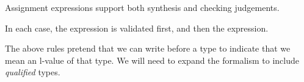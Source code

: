 \begin{Description}
Assignment expressions support both synthesis and checking judgements.

In each case, the  expression is validated first, and then the  expression.
\end{Description}

\begin{Incomplete}
The above rules pretend that we can write  before a type to indicate that we mean an l-value of that type.
We will need to expand the formalism to include \emph{qualified} types.
\end{Incomplete}



\begin{Syntax}
	 \\
         

     \\
        \code{+}  \\
        \SynOr \code{-}  \\
        \SynOr \code{\~}  \\
        \SynOr \code{!}  \\
        \SynOr \code{++}  \\
        \SynOr \code{--}  \\
\end{Syntax}

\begin{Checking}

\end{Checking}

